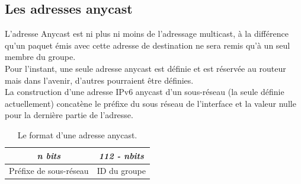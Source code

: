 \subsection{Les adresses anycast}

L'adresse Anycast est ni plus ni moins de l'adressage multicast, à la différence qu'un paquet émis avec cette adresse de destination ne sera remis qu'à un seul membre du groupe. \\
Pour l'instant, une seule adresse anycast est définie et est réservée au routeur mais dans l'avenir, d'autres pourraient être définies. \\
La construction d'une adresse IPv6 anycast d'un sous-réseau (la seule définie actuellement) concatène le préfixe du sous réseau de l'interface et la valeur nulle pour la dernière partie de l'adresse.

\begin{table}[!h]
  \centering
  \begin{tabular}{|c|c|} 
   \hline
	\textit{n bits} & \textit{112 - nbits} \\
    \hline
    {Préfixe de sous-réseau} & {ID du groupe} \\
    \hline
  \end{tabular}
  \caption{Le format d'une adresse anycast.}
\end{table}
